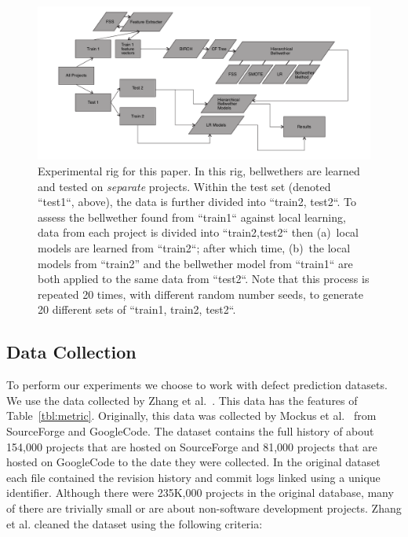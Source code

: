 \documentclass[10pt,journal,compsoc]{IEEEtran}
\begin{document}
\begin{figure}[!t]
    \centering
    \includegraphics[width=\linewidth]{figs/General.pdf}
    \caption{ Experimental rig for this paper.  In this rig, 
      bellwethers are
    learned and tested on {\em separate } projects. Within the test set (denoted ``test1``, above),
    the data is further divided into ``train2, test2``. To assess the bellwether found from ``train1`` against local learning, data from each project is divided into ``train2,test2``
    then (a)~local
    models are learned from   ``train2``; after which time,
    (b)~the local models from ``train2'' and the bellwether model from ``train1``
    are both applied to the same data from ``test2``.
    Note that this process is repeated 20 times, with different random number seeds, to generate 20 different sets of ``train1, train2, test2``.
    }
    \label{fig:GENERAL}
\end{figure}

\subsection{Data Collection}
\label{sec:data}

To perform our experiments we choose to work with defect prediction datasets. We use 
the data collected by Zhang et al.~\cite{zhang15}.
This data has the features of Table~\ref{tbl:metric}.
Originally, this data  was collected by Mockus et al.~\cite{mockus2009amassing} from SourceForge and GoogleCode. The dataset contains the full history of about 154,000 projects that are hosted on SourceForge and 81,000 projects that are hosted on GoogleCode to the date they were collected. In the original dataset each file contained the revision history and commit logs linked using a unique identifier. Although there were 235K,000 projects in the original database, many of there are
trivially small or are about  non-software development projects. Zhang et al. cleaned the dataset using the following    criteria:
\end{document}
